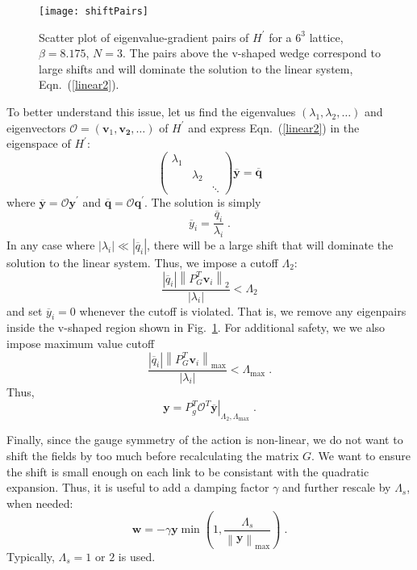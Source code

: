 \documentclass[preprint,aps,prd]{revtex4-2}
\newcommand{\be}{\begin{equation}}
\newcommand{\eq}{\end{equation}}
\begin{document}
\begin{figure}
\texttt{[image: shiftPairs]}
\caption{Scatter plot of eigenvalue-gradient pairs of $H^\prime$
  for a $6^3$ lattice, $\beta = 8.175$, $N=3$.  The pairs above the
  v-shaped wedge correspond to large shifts and will dominate
  the solution to the linear system, Eqn.~(\ref{linear2}).
  \label{shiftPairs}}
\end{figure}

To better understand this issue, let us find the eigenvalues
$\left(\lambda_1, \lambda_2, \ldots\right)$ and
eigenvectors $\mathcal{O}=\left(\mathbf{v}_1, \mathbf{v_2}, \ldots\right)$
of $H^\prime$ and express Eqn.~(\ref{linear2}) in the eigenspace of $H^\prime$:
\be
\begin{pmatrix}
    \lambda_1 & & \\
    & \lambda_2 & \\
    & & \ddots  \end{pmatrix} \overline{\mathbf{y}} =
  \overline{\mathbf{q}} \label{linear3}
\eq
where $\overline{\mathbf{y}} = \mathcal{O} \mathbf{y}^\prime$ and
$\overline{\mathbf{q}}  = \mathcal{O} \mathbf{q}^\prime$.
The solution is simply
\be
    \overline{y}_i = \frac{\overline{q}_i}{\lambda_i} \; .
\eq
In any case where $\left|\lambda_i\right|\ll
\left|\overline{q}_i\right|$,
there will be a large shift that will dominate the solution
to the linear system.
Thus, we impose a cutoff $\Lambda_2$:
\be
    \frac{\left|\overline{q}_i\right|\left\lVert P_G^T \mathbf{v}_i\right\rVert_2}{\left|\lambda_i\right|}
     < \Lambda_2 \label{lambda2}
\eq
%
and set $\overline{y}_i=0$ whenever the cutoff is violated.
That is, we remove any eigenpairs inside the v-shaped
region shown in Fig.~\ref{shiftPairs}.  For additional safety, we
we also impose maximum value cutoff
\be
    \frac{\left|\overline{q}_i\right|
      \left\lVert P_G^T \mathbf{v}_i\right\rVert_\mathrm{max}}
    {\left|\lambda_i\right|}
    < \Lambda_\mathrm{max} \; .
\eq
Thus,
\be
      \mathbf{y} = P_g^T \left. \mathcal{O}^T
                    \overline{\mathbf{y}}\right|_{\Lambda_2,\Lambda_\mathrm{max}} \; .
\eq

Finally, since the gauge symmetry of the action is non-linear,
we do not want to shift the fields by too much before recalculating
the matrix $G$.  We want to ensure the shift is small
enough on each link to be consistant with the quadratic expansion.
Thus, it is useful to add a damping factor $\gamma$ and
further rescale by $\Lambda_s$, when needed:
\be
    \mathbf{w} = - \gamma \mathbf{y} \min\left(1, \frac{\Lambda_s}{\left\lVert \mathbf{y}\right\rVert_\mathrm{max}}\right) \; .
\eq
Typically, $\Lambda_s = 1$ or $2$ is used.
\end{document}
